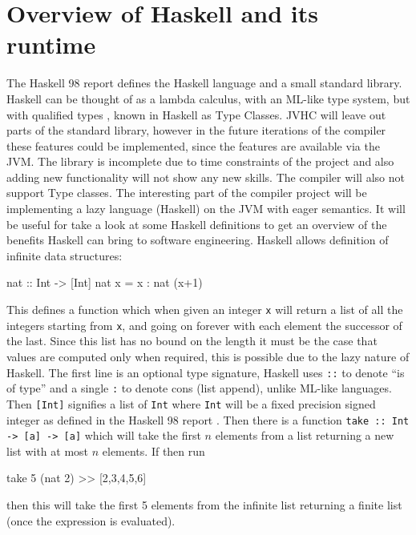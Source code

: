 \documentclass[float=false, crop=false]{standalone}
\begin{document}
\section{Overview of Haskell and its runtime}

The Haskell 98 \cite{haskell98-spec} report defines the Haskell language 
and a small standard library.
Haskell can be thought of as a lambda calculus, with an ML-like type system,
but with qualified types \cite{qualified-types}, known in 
Haskell as Type Classes. JVHC will
leave out parts of the standard library, however in the future 
iterations of the compiler these 
features could be implemented, since the features are available via the JVM.
The library is incomplete due to time constraints of the project and
also adding new functionality will not show any new skills.
The compiler will also not support Type classes. The interesting
part of the compiler project will be implementing a lazy language (Haskell)
on the JVM with eager semantics.
It will be useful for take a look at some Haskell definitions to get
an overview of the benefits Haskell can bring to software engineering.
Haskell allows definition of infinite data structures:
\begin{HaskellLst}
nat :: Int -> [Int]
nat x = x : nat (x+1)
\end{HaskellLst}
This defines a function which when given an integer \verb|x| will return 
a list of all the integers starting from \texttt{x}, and going on forever with
each element the successor of the last.
Since this list has no bound on the length it must be the case 
that values are computed only when required, 
this is possible due to the lazy nature of Haskell. 
The first line is an optional type signature, Haskell
uses \verb|::| to denote ``is of type'' and a single \verb|:| to denote cons (list append), unlike ML-like languages. Then \verb|[Int]| signifies a list
of \verb|Int| where \verb|Int| will be a fixed precision 
signed integer as defined in the Haskell 98 report 
\cite[]{haskell98-spec}.
Then there is a function \verb|take :: Int -> [a] -> [a]| which will
take the first $n$ elements from a list returning a new list with at most
$n$ elements.
If then run 
\begin{HaskellLst}
take 5 (nat 2)
>> [2,3,4,5,6]
\end{HaskellLst}
then this will take the first 5 elements from the infinite list returning 
a finite list (once the expression is evaluated).
\end{document}
